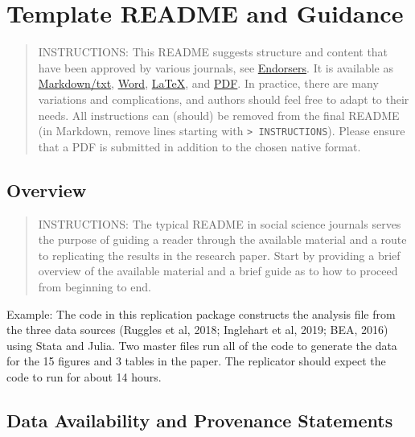\documentclass[
]{article}
\author{}
\date{}
\begin{document}
\hypertarget{template-readme-and-guidance}{%
\section{Template README and
Guidance}\label{template-readme-and-guidance}}

\begin{quote}
INSTRUCTIONS: This README suggests structure and content that have been
approved by various journals, see
\href{https://social-science-data-editors.github.io/template_README/Endorsers.html}{Endorsers}.
It is available as
\href{https://github.com/social-science-data-editors/template_README/blob/master/template-README.html}{Markdown/txt},
\href{https://social-science-data-editors.github.io/template_README/templates/README.docx}{Word},
\href{https://social-science-data-editors.github.io/template_README/templates/README.tex}{LaTeX},
and
\href{https://social-science-data-editors.github.io/template_README/templates/README.pdf}{PDF}.
In practice, there are many variations and complications, and authors
should feel free to adapt to their needs. All instructions can (should)
be removed from the final README (in Markdown, remove lines starting
with \texttt{\textgreater{}\ INSTRUCTIONS}). Please ensure that a PDF is
submitted in addition to the chosen native format.
\end{quote}

\hypertarget{overview}{%
\subsection{Overview}\label{overview}}

\begin{quote}
INSTRUCTIONS: The typical README in social science journals serves the
purpose of guiding a reader through the available material and a route
to replicating the results in the research paper. Start by providing a
brief overview of the available material and a brief guide as to how to
proceed from beginning to end.
\end{quote}

Example: The code in this replication package constructs the analysis
file from the three data sources (Ruggles et al, 2018; Inglehart et al,
2019; BEA, 2016) using Stata and Julia. Two master files run all of the
code to generate the data for the 15 figures and 3 tables in the paper.
The replicator should expect the code to run for about 14 hours.

\hypertarget{data-availability-and-provenance-statements}{%
\subsection{Data Availability and Provenance
Statements}\label{data-availability-and-provenance-statements}}
\end{document}
